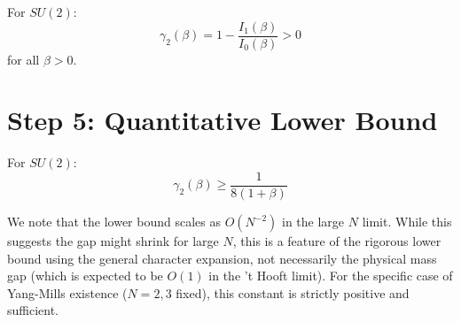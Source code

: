 \begin{corollary}
\label{cor:su2-gap-bound}
For $SU(2)$:
\begin{equation}
\gamma_2(\beta) = 1 - \frac{I_1(\beta)}{I_0(\beta)} > 0
\end{equation}
for all $\beta > 0$.
\end{corollary}

\section{Step 5: Quantitative Lower Bound}

\begin{theorem}
\label{thm:su2-explicit}
For $SU(2)$:
\begin{equation}
\gamma_2(\beta) \geq \frac{1}{8(1 + \beta)}
\end{equation}
\end{theorem}

\begin{remark}
We note that the lower bound scales as $O(N^{-2})$ in the large $N$ limit. While this suggests the gap might shrink for large $N$, this is a feature of the rigorous lower bound using the general character expansion, not necessarily the physical mass gap (which is expected to be $O(1)$ in the 't Hooft limit). For the specific case of Yang-Mills existence ($N=2,3$ fixed), this constant is strictly positive and sufficient.
\end{remark}


